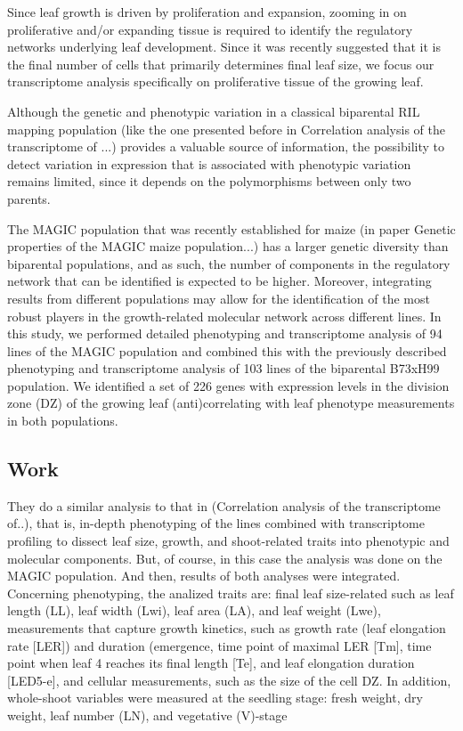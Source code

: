 \documentclass[a4paper,10pt]{article}
\begin{document}
Since leaf growth is driven by proliferation and expansion, zooming in on proliferative and/or expanding tissue is required to identify the regulatory networks underlying leaf development. 
Since it was recently suggested that it is the final number of cells that primarily determines final leaf size, we focus our transcriptome analysis specifically on proliferative tissue of the growing leaf.

Although the genetic and phenotypic variation in a classical biparental RIL mapping population (like the one presented before in Correlation analysis of the transcriptome of ...) provides a valuable source of information, 
the possibility to detect variation in expression that is associated with phenotypic variation remains limited, since it depends on the polymorphisms between only two parents.

The MAGIC population that was recently established for maize (in paper Genetic properties of the MAGIC maize population...) has a larger genetic diversity than biparental populations, and as such, the number of components in the regulatory network that can be identified is expected to be higher.
Moreover, integrating results from different populations may allow for the identification of the most robust players in the growth-related molecular network across different lines.
In this study, we performed detailed phenotyping and transcriptome analysis of 94 lines of the MAGIC population and combined this with the previously described phenotyping and transcriptome analysis of 103 lines of the biparental B73xH99 population. 
We identified a set of 226 genes with expression levels in the division zone (DZ) of the growing leaf (anti)correlating with leaf phenotype measurements in both populations.

\subsection{Work}
They do a similar analysis to that in (Correlation analysis of the transcriptome of..), that is, in-depth phenotyping of the lines combined with transcriptome profiling to dissect leaf size, growth, and shoot-related traits into phenotypic and molecular components.
But, of course, in this case the analysis was done on the MAGIC population. And then, results of both analyses were integrated.
Concerning phenotyping, the analized traits are: final leaf size-related such as leaf length (LL), leaf width (Lwi), leaf area (LA), and leaf weight (Lwe), measurements that capture growth kinetics, such as growth rate (leaf elongation rate [LER]) and duration (emergence, time point of maximal LER [Tm], time point when leaf 4 reaches its final length [Te], and leaf elongation duration [LED5-e], 
and cellular measurements, such as the size of the cell DZ. In addition, whole-shoot variables were measured at the seedling stage: fresh weight, dry weight, leaf number (LN), and vegetative (V)-stage
\end{document}
